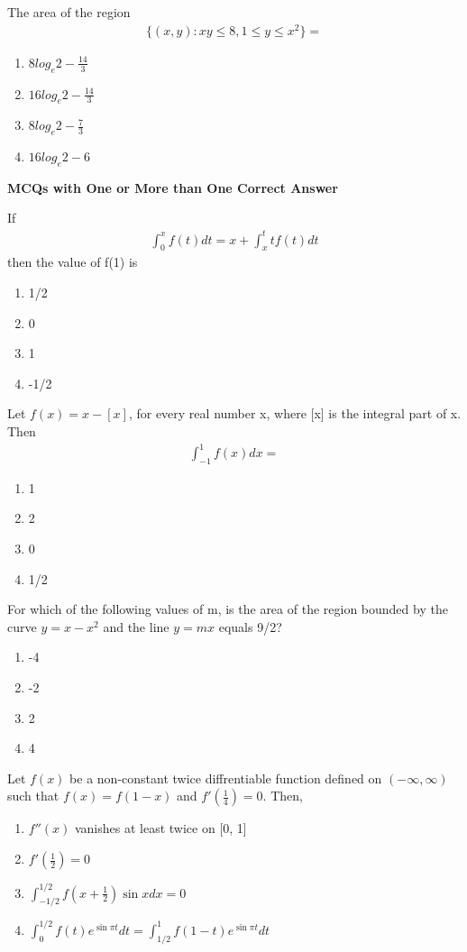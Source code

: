 \item The area of the region
\begin{align*}
\{(x, y): xy \leq 8, 1 \leq y \leq x^2\} = 
\end{align*}
\begin{enumerate}
\item $8log_e2 - \frac{14}{3}$
\item $16log_e2 - \frac{14}{3}$
\item $8log_e2 - \frac{7}{3}$
\item $16log_e2 - 6$
\end{enumerate}

\textbf{MCQs with One or More than One Correct Answer}

\item If 
\begin{align*}
\int_{0}^{x}f(t)dt = x + \int_{x}^{t} tf(t)dt
\end{align*}
then the value of f(1) is
\begin{enumerate}
\item 1/2
\item 0
\item 1
\item -1/2
\end{enumerate}

\item Let $f(x) = x - [x]$, for every real number x, where [x] is the integral part of x. Then 
\begin{align*}
\int_{-1}^{1}f(x)dx = 
\end{align*}
\begin{enumerate}
\item 1
\item 2
\item 0
\item 1/2
\end{enumerate}

\item For which of the following values of m, is the area of the region bounded by the curve $y = x - x^{2}$ and the line 
$y = mx$ equals 9/2?
\begin{enumerate}
\item -4
\item -2
\item  2 
\item  4
\end{enumerate}

\item Let $f(x)$ be a non-constant twice diffrentiable function defined on $(-\infty, \infty)$ such that $f(x) = f(1 - x)$ and $f'(\frac{1}{4}) = 0$. Then,
\begin{enumerate}
\item $f''(x)$ vanishes at least twice on [0, 1]
\item $f'(\frac{1}{2}) = 0$
\item $\int_{-1/2}^{1/2}f(x + \frac{1}{2})\sin x dx = 0$
\item $\int_{0}^{1/2}f(t)e^{\sin \pi t}dt = \int_{1/2}^{1}f(1 - t)e^{\sin \pi t}dt$
\end{enumerate}


